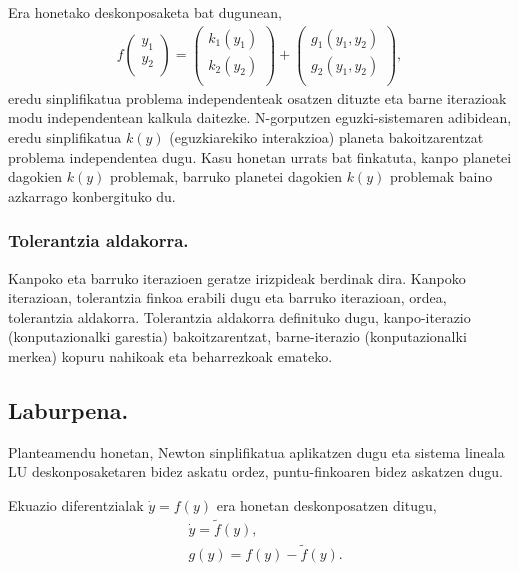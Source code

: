 Era honetako deskonposaketa bat dugunean,
\begin{align*}
f\left ( \begin{array}{c}
   y_1 \\
   y_2 \\
\end{array} \right)=
\left ( \begin{array}{c}
   k_1(y_1) \\
   k_2(y_2) \\
\end{array} \right)+
\left ( \begin{array}{c}
   g_1(y_1,y_2) \\
   g_2(y_1,y_2) \\
\end{array} \right),
\end{align*}
%
eredu sinplifikatua problema independenteak osatzen dituzte eta barne iterazioak modu independentean kalkula daitezke. N-gorputzen eguzki-sistemaren adibidean, eredu sinplifikatua $k(y)$ (eguzkiarekiko interakzioa) planeta bakoitzarentzat problema independentea dugu. Kasu honetan urrats bat finkatuta, kanpo planetei dagokien $k(y)$ problemak, barruko planetei dagokien  $k(y)$ problemak baino azkarrago konbergituko du. 

\subsubsection*{Tolerantzia aldakorra.}

Kanpoko eta barruko iterazioen geratze irizpideak berdinak dira. Kanpoko iterazioan, tolerantzia finkoa erabili dugu eta barruko iterazioan, ordea, tolerantzia aldakorra. Tolerantzia aldakorra definituko dugu, kanpo-iterazio (konputazionalki garestia) bakoitzarentzat, barne-iterazio (konputazionalki merkea) kopuru nahikoak eta beharrezkoak emateko.     
 

\subsection*{Laburpena.}
Planteamendu honetan,  Newton sinplifikatua aplikatzen dugu eta  sistema lineala LU deskonposaketaren bidez askatu ordez, puntu-finkoaren bidez askatzen dugu.

Ekuazio diferentzialak $\dot{y}=f(y)$ era honetan deskonposatzen ditugu,
\begin{align*}
&\dot{y}=\tilde{f}(y),\\
&g(y)=f(y)-\tilde{f}(y).
\end{align*}


